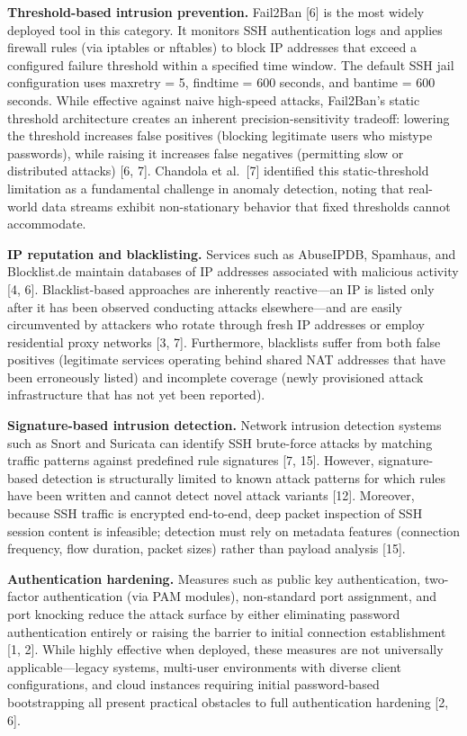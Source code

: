 \documentclass[
  a4paper]{report}
\begin{document}
\textbf{Threshold-based intrusion prevention.} Fail2Ban {[}6{]} is the
most widely deployed tool in this category. It monitors SSH
authentication logs and applies firewall rules (via iptables or
nftables) to block IP addresses that exceed a configured failure
threshold within a specified time window. The default SSH jail
configuration uses maxretry = 5, findtime = 600 seconds, and bantime =
600 seconds. While effective against naive high-speed attacks,
Fail2Ban's static threshold architecture creates an inherent
precision-sensitivity tradeoff: lowering the threshold increases false
positives (blocking legitimate users who mistype passwords), while
raising it increases false negatives (permitting slow or distributed
attacks) {[}6, 7{]}. Chandola et al.~{[}7{]} identified this
static-threshold limitation as a fundamental challenge in anomaly
detection, noting that real-world data streams exhibit non-stationary
behavior that fixed thresholds cannot accommodate.

\textbf{IP reputation and blacklisting.} Services such as AbuseIPDB,
Spamhaus, and Blocklist.de maintain databases of IP addresses associated
with malicious activity {[}4, 6{]}. Blacklist-based approaches are
inherently reactive---an IP is listed only after it has been observed
conducting attacks elsewhere---and are easily circumvented by attackers
who rotate through fresh IP addresses or employ residential proxy
networks {[}3, 7{]}. Furthermore, blacklists suffer from both false
positives (legitimate services operating behind shared NAT addresses
that have been erroneously listed) and incomplete coverage (newly
provisioned attack infrastructure that has not yet been reported).

\textbf{Signature-based intrusion detection.} Network intrusion
detection systems such as Snort and Suricata can identify SSH
brute-force attacks by matching traffic patterns against predefined rule
signatures {[}7, 15{]}. However, signature-based detection is
structurally limited to known attack patterns for which rules have been
written and cannot detect novel attack variants {[}12{]}. Moreover,
because SSH traffic is encrypted end-to-end, deep packet inspection of
SSH session content is infeasible; detection must rely on metadata
features (connection frequency, flow duration, packet sizes) rather than
payload analysis {[}15{]}.

\textbf{Authentication hardening.} Measures such as public key
authentication, two-factor authentication (via PAM modules),
non-standard port assignment, and port knocking reduce the attack
surface by either eliminating password authentication entirely or
raising the barrier to initial connection establishment {[}1, 2{]}.
While highly effective when deployed, these measures are not universally
applicable---legacy systems, multi-user environments with diverse client
configurations, and cloud instances requiring initial password-based
bootstrapping all present practical obstacles to full authentication
hardening {[}2, 6{]}.
\end{document}
